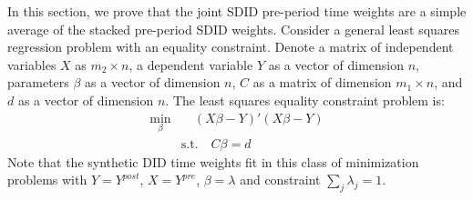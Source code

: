 \documentclass[12pt]{article}
\begin{document}
In this section, we prove that the joint SDID pre-period time weights are a simple average of the stacked pre-period SDID weights.  Consider a general least squares regression problem with an equality constraint.  Denote a matrix of independent variables \(X\) as \(m_2 \times n\), a dependent variable \(Y\) as a vector of dimension \(n\), parameters \(\beta\) as a vector of dimension \(n\), \(C\) as a matrix of dimension \(m_1 \times n\), and \(d\) as a vector of dimension \(n\).  The least squares equality constraint problem is:
\begin{align}
    \underset{\beta}{\min} & \quad (X\beta - Y)'(X\beta - Y) \\ 
    & \text{s.t.} \quad C\beta = d
\end{align}
Note that the synthetic DID time weights fit in this class of minimization problems with \(Y = Y^{post}\), \(X =  Y^{pre}\), \(\beta = \lambda\) and constraint \(\sum_j \lambda_j = 1\).
\end{document}
